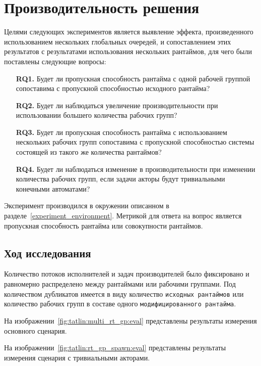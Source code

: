 \section{Производительность решения}

Целями следующих экспериментов является выявление эффекта, произведенного использованием нескольких глобальных очередей, и сопоставлением этих результатов с результатами использования нескольких рантаймов, для чего были поставлены следующие вопросы:

\begin{itemize}\label{quest}
    \item[\textbf{RQ1.}] Будет ли пропускная способность рантайма с одной рабочей группой сопоставима с пропускной способностью исходного рантайма?
    \item[\textbf{RQ2.}] Будет ли наблюдаться увеличение производительности при использовании большего количества рабочих групп?
    \item[\textbf{RQ3.}] Будет ли пропускная способность рантайма с использованием нескольких рабочих групп сопоставима с пропускной способностью системы состоящей из такого же количества рантаймов?
    \item[\textbf{RQ4.}] Будет ли наблюдаться изменение в производительности при изменении количества рабочих групп, если задачи акторы будут тривиальными конечными автоматами?
\end{itemize}

Эксперимент производился в окружении описанном в разделе~\ref{experiment_environment}. Метрикой для ответа на вопрос является пропускная способность рантайма или совокупности рантаймов.

\subsection{Ход исследования}

Количество потоков исполнителей и задач производителей было фиксировано и равномерно распределено между рантаймами или рабочими группами. Под количеством дубликатов имеется в виду количество \verb|исходных рантаймов| или количество рабочих групп в составе одного \verb|модифицированного рантайма|.

На изображении~\ref{fig:tatlin:multi_rt_gp:eval} представлены результаты измерения основного сценария.

На изображении~\ref{fig:tatlin:rt_gp_spawn:eval} представлены результаты измерения сценария с тривиальными акторами.

